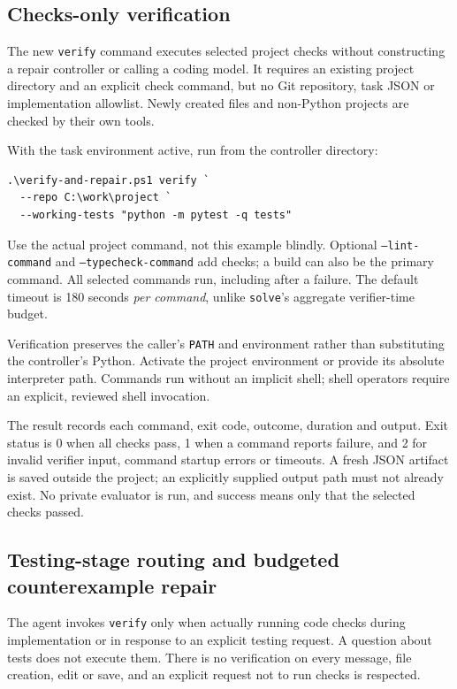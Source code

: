 \documentclass[10pt,twocolumn,a4paper]{article}
\begin{document}
\subsection{Checks-only verification}
The new \texttt{verify} command executes selected project checks without
constructing a repair controller or calling a coding model. It requires an
existing project directory and an explicit check command, but no Git
repository, task JSON or implementation allowlist. Newly created files and
non-Python projects are checked by their own tools.

With the task environment active, run from the controller directory:
\begin{lstlisting}
.\verify-and-repair.ps1 verify `
  --repo C:\work\project `
  --working-tests "python -m pytest -q tests"
\end{lstlisting}
Use the actual project command, not this example blindly. Optional
\texttt{--lint-command} and \texttt{--typecheck-command} add checks; a build
can also be the primary command. All selected commands run, including after
a failure. The default timeout is 180 seconds \emph{per command}, unlike
\texttt{solve}'s aggregate verifier-time budget.

Verification preserves the caller's \texttt{PATH} and environment rather
than substituting the controller's Python. Activate the project environment
or provide its absolute interpreter path. Commands run without an implicit
shell; shell operators require an explicit, reviewed shell invocation.

The result records each command, exit code, outcome, duration and output.
Exit status is 0 when all checks pass, 1 when a command reports failure, and
2 for invalid verifier input, command startup errors or timeouts. A fresh JSON
artifact is saved outside the project; an explicitly supplied output path
must not already exist. No private evaluator is run, and success means only
that the selected checks passed.

\subsection{Testing-stage routing and budgeted counterexample repair}
The agent invokes \texttt{verify} only when actually running code checks
during implementation or in response to an explicit testing request.
A question about tests does not execute them. There is no verification on
every message, file creation, edit or save, and an explicit request not to
run checks is respected.
\end{document}
